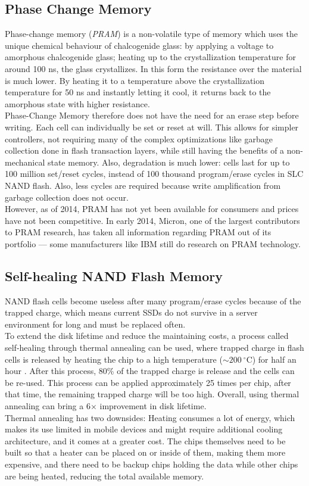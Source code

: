 \documentclass{acm_proc_article-sp}
\begin{document}
\subsection{Phase Change Memory}
Phase-change memory (\emph{PRAM}) is a non-volatile type of memory which uses the unique chemical behaviour of chalcogenide glass: by applying a voltage to amorphous chalcogenide glass; heating up to the crystallization temperature for around 100 ns, the glass crystallizes. In this form the resistance over the material is much lower. By heating it to a temperature above the crystallization temperature for 50 ns and instantly letting it cool, it returns back to the amorphous state with higher resistance.
\\
Phase-Change Memory therefore does not have the need for an erase step before writing. Each cell can individually be set or reset at will. This allows for simpler controllers, not requiring many of the complex optimizations like garbage collection done in flash transaction layers, while still having the benefits of a non-mechanical state memory. Also, degradation is much lower: cells last for up to 100 million set/reset cycles, instead of 100 thousand program/erase cycles in SLC NAND flash. Also, less cycles are required because write amplification from garbage collection does not occur.
\\
However, as of 2014, PRAM has not yet been available for consumers and prices have not been competitive. In early 2014, Micron, one of the largest contributors to PRAM research, has taken all information regarding PRAM out of its portfolio --- some manufacturers like IBM still do research on PRAM technology.

\subsection{Self-healing NAND Flash Memory}
NAND flash cells become useless after many program/erase cycles because of the trapped charge, which means current SSDs do not survive in a server environment for long and must be replaced often.
\\
To extend the disk lifetime and reduce the maintaining costs, a process called self-healing through thermal annealing can be used, where trapped charge in flash cells is released by heating the chip to a high temperature ($\sim 200~^{\circ}$C) for half an hour \cite{wu2011exploiting}. After this process, 80\% of the trapped charge is release and the cells can be re-used. This process can be applied approximately 25 times per chip, after that time, the remaining trapped charge will be too high. Overall, using thermal annealing can bring a 6$\times$ improvement in disk lifetime.
\\
Thermal annealing has two downsides: Heating consumes a lot of energy, which makes its use limited in mobile devices and might require additional cooling architecture, and it comes at a greater cost. The chips themselves need to be built so that a heater can be placed on or inside of them, making them more expensive, and there need to be backup chips holding the data while other chips are being heated, reducing the total available memory.
\end{document}
